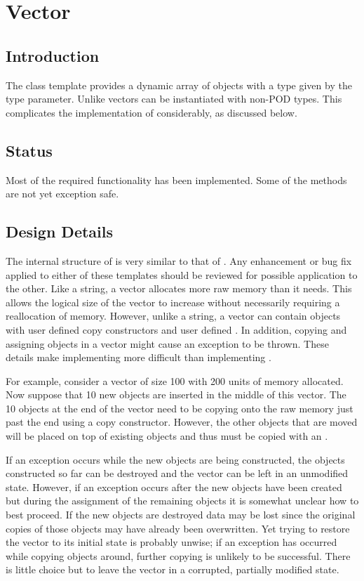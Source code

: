 
\chapter{Vector}

\section{Introduction}

The class template  provides a dynamic array of objects with
a type given by the type parameter. Unlike  vectors can be
instantiated with non-POD types. This complicates the implementation of
 considerably, as discussed below.

\section{Status}

Most of the required functionality has been implemented. Some of the methods
are not yet exception safe.

\section{Design Details}

The internal structure of  is very similar to that of
. Any enhancement or bug fix applied to either of these templates
should be reviewed for possible application to the other. Like a string, a
vector allocates more raw memory than it needs. This allows the logical size
of the vector to increase without necessarily requiring a reallocation of
memory. However, unlike a string, a vector can contain objects with user
defined copy constructors and user defined . In addition,
copying and assigning objects in a vector might cause an exception to be
thrown. These details make implementing  more difficult than
implementing .

For example, consider a vector of size 100 with 200 units of memory allocated.
Now suppose that 10 new objects are inserted in the middle of this vector. The
10 objects at the end of the vector need to be copying onto the raw memory
just past the end using a copy constructor. However, the other objects that
are moved will be placed on top of existing objects and thus must be copied
with an .

If an exception occurs while the new objects are being constructed, the
objects constructed so far can be destroyed and the vector can be left in an
unmodified state. However, if an exception occurs after the new objects have
been created but during the assignment of the remaining objects it is somewhat
unclear how to best proceed. If the new objects are destroyed data may be lost
since the original copies of those objects may have already been overwritten.
Yet trying to restore the vector to its initial state is probably unwise; if
an exception has occurred while copying objects around, further copying is
unlikely to be successful. There is little choice but to leave the vector in a
corrupted, partially modified state.
